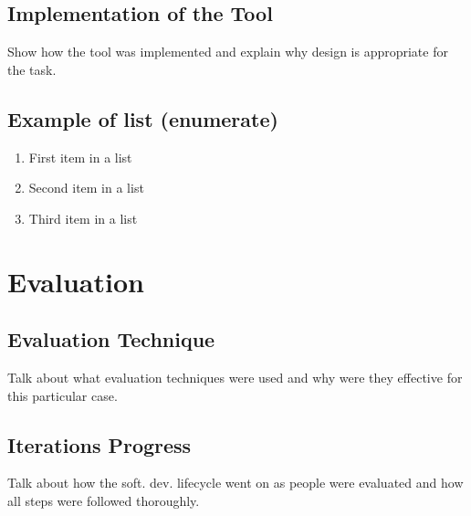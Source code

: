 \documentclass[paper=a4, fontsize=11pt]{scrartcl} %
\numberwithin{equation}{section} %
\numberwithin{figure}{section} %
\numberwithin{table}{section} %
\begin{document}
\subsection{Implementation of the Tool}

\par
Show how the tool was implemented and explain why design is appropriate for the task.


\subsection{Example of list (enumerate)}
\begin{enumerate}
	\item First item in a list 
	\item Second item in a list 
	\item Third item in a list
\end{enumerate}



\section{Evaluation}


\subsection{Evaluation Technique}

\par
Talk about what evaluation techniques were used and why were they effective for this particular case.


\subsection{Iterations Progress}

\par
Talk about how the soft. dev. lifecycle went on as people were evaluated and how all steps were followed thoroughly.
\end{document}
